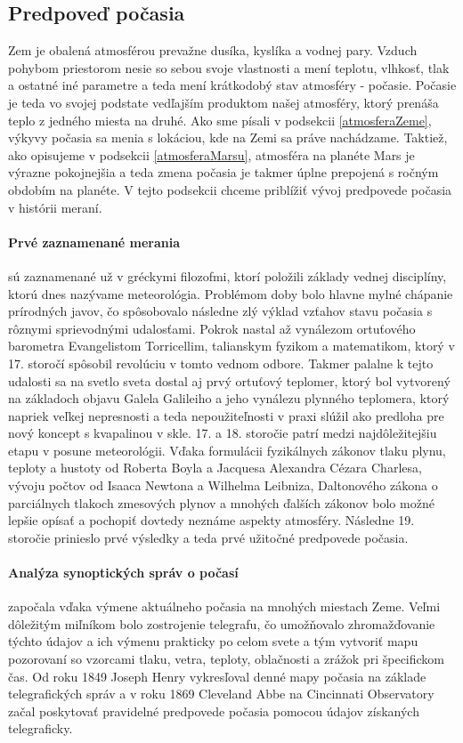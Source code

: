 \newpage
\subsection{Predpoveď počasia}
Zem je obalená atmosférou prevažne dusíka, kyslíka a vodnej pary. Vzduch pohybom priestorom nesie so sebou svoje vlastnosti a mení teplotu, vlhkosť, tlak a ostatné iné parametre a teda mení krátkodobý stav atmosféry - počasie. Počasie je teda vo svojej podstate vedľajším produktom našej atmosféry, ktorý prenáša teplo z jedného miesta na druhé.
Ako sme písali v podsekcii \ref{atmosferaZeme}, výkyvy počasia sa menia s lokáciou, kde na Zemi sa práve nachádzame. Taktiež, ako opisujeme v podsekcii \ref{atmosferaMarsu}, atmosféra na planéte Mars je výrazne pokojnejšia a teda zmena počasia je takmer úplne prepojená s ročným obdobím na planéte.
V tejto podsekcii chceme priblížiť vývoj predpovede počasia v histórii meraní.


\paragraph{Prvé zaznamenané merania} sú zaznamenané už v gréckymi filozofmi, ktorí položili základy vednej disciplíny, ktorú dnes nazývame meteorológia. Problémom doby bolo hlavne mylné chápanie prírodných javov, čo spôsobovalo následne zlý výklad vzťahov stavu počasia s rôznymi sprievodnými udalosťami. Pokrok nastal až vynálezom ortuťového barometra Evangelistom Torricellim, talianskym fyzikom a matematikom, ktorý v 17. storočí spôsobil revolúciu v tomto vednom odbore. Takmer palalne k tejto udalosti sa na svetlo sveta dostal aj prvý ortuťový teplomer, ktorý bol vytvorený na základoch objavu Galela Galileiho a jeho vynálezu plynného teplomera, ktorý napriek veľkej nepresnosti a teda nepoužiteľnosti v praxi slúžil ako predloha pre nový koncept s kvapalinou v skle.
17. a 18. storočie patrí medzi najdôležitejšiu etapu v posune meteorológii. Vďaka formulácii fyzikálnych zákonov tlaku plynu, teploty a hustoty od Roberta Boyla a Jacquesa Alexandra Cézara Charlesa, vývoju počtov od Isaaca Newtona a Wilhelma Leibniza, Daltonového zákona o parciálnych tlakoch zmesových plynov a mnohých ďalších zákonov bolo možné lepšie opísať a pochopiť dovtedy neznáme aspekty atmosféry. Následne 19. storočie prinieslo prvé výsledky a teda prvé užitočné predpovede počasia.

\paragraph{Analýza synoptických správ o počasí} započala vďaka výmene aktuálneho počasia na mnohých miestach Zeme. Veľmi dôležitým miľníkom bolo zostrojenie telegrafu, čo umožňovalo zhromažďovanie týchto údajov a ich výmenu prakticky po celom svete a tým vytvoriť mapu pozorovaní so vzorcami tlaku, vetra, teploty, oblačnosti a zrážok pri špecifickom čas. Od roku 1849 Joseph Henry vykresľoval denné mapy počasia na základe telegrafických správ a v roku 1869 Cleveland Abbe na Cincinnati Observatory začal poskytovať pravidelné predpovede počasia pomocou údajov získaných telegraficky.

